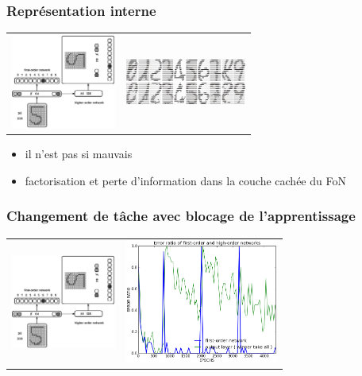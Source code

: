 \documentclass[11pt]{beamer}
\begin{document}
\begin{frame}
  \frametitle{Représentation interne}
  
    \begin{center}
  \begin{tabular}{cc}
  \hspace*{-1cm}
   \includegraphics[width=130px]{../cleeremans_2007/digit_reco/schema_handwritten.png}
   &
   \includegraphics[width=150px]{../pre-rapport/metarepre.png}
  \end{tabular}
  \end{center}

\begin{itemize}
 \item il n'est pas si mauvais
 \item factorisation et perte d'information dans la couche cachée du FoN
\end{itemize}
\end{frame}



\begin{frame}
  \frametitle{Changement de tâche avec blocage de l'apprentissage}
  
    \begin{center}
  \begin{tabular}{cc}
  \hspace*{-1cm}
   \includegraphics[width=130px]{../cleeremans_2007/digit_reco/schema_handwritten.png}
   &
   \includegraphics[width=190px]{../cleeremans_2007/digit_reco/err_handwritten_relearn_2.png}
  \end{tabular}
  \end{center}
\end{frame}
\end{document}
